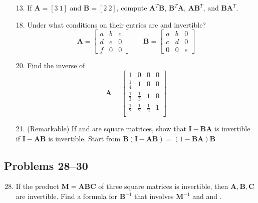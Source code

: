 \begin{itemize}
\begin{itemize}
      \item[13.] If \(\bm{A} = [3~1]\) and \(\bm{B} = [2~2]\), compute
        \(\bm{A}^T \bm{B}\), \(\bm{B}^T \bm{A}\), \(\bm{AB}^T\), and \(\bm{BA}^T\).

      \item[18.] Under what conditions on their entries are  and 
        invertible?
        \[%
        \bm{A} =
        \begin{bmatrix}
        a & b & c \\
        d & e & 0 \\
        f & 0 & 0
        \end{bmatrix} \qquad
        \bm{B} =
        \begin{bmatrix}
        a & b & 0 \\
        c & d & 0 \\
        0 & 0 & e
        \end{bmatrix}
        \]%

      \item[20.] Find the inverse of
        \[%
        \bm{A} =
        \begin{bmatrix}
          1 & 0 & 0 & 0 \\
          \frac{1}{4} & 1 & 0 & 0 \\
          \frac{1}{3} & \frac{1}{3} & 1 & 0 \\
          \frac{1}{2} & \frac{1}{2} & \frac{1}{2} & 1 \\
        \end{bmatrix}
        \]%

      \item[21.] (Remarkable) If  and  are square matrices, show
        that \(\bm{I}-\bm{BA}\) is invertible if \(\bm{I}-\bm{AB}\) is
        invertible. Start from \( \bm{B}(\bm{I} - \bm{AB}) = (1 -
        \bm{BA})\bm{B}\)

    \end{itemize}

    \subsection{Problems 28--30}
    \begin{enumerate}\setcounter{enumi}{27}\color{foreground-2}
      \item If the product \(\bm{M} = \bm{ABC}\) of three square matrices is invertible, then
        \(\bm{A}, \bm{B}, \bm{C}\) are invertible. Find a formula for \(
        \bm{B}^{-1} \) that involves \( \bm{M}^{-1} \) and  and .


\end{enumerate}
\end{itemize}
